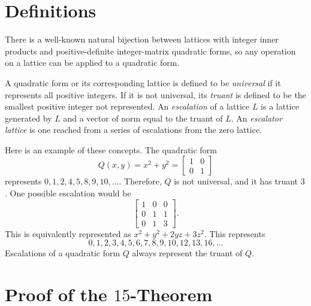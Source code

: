 \documentclass[letterpaper, 12pt]{article}
\begin{document}
\section{Definitions}
There is a well-known natural bijection between lattices with integer inner products and positive-definite integer-matrix quadratic forms, so any operation on a lattice can be applied to a quadratic form.

A quadratic form or its corresponding lattice is defined to be \emph{universal} if it represents all positive integers. If it is not universal, its \emph{truant} is defined to be the smallest positive integer not represented. An \emph{escalation} of a lattice $L$ is a lattice generated by $L$ and a vector of norm equal to the truant of $L$. An \emph{escalator lattice} is one reached from a series of escalations from the zero lattice.

Here is an example of these concepts. The quadratic form
\[Q(x, y) = x^2 + y^2 = \begin{bmatrix} 1 & 0 \\ 0 & 1 \end{bmatrix}\]
represents $0, 1, 2, 4, 5, 8, 9, 10, \ldots$. Therefore, $Q$ is not universal, and it has truant $3$. One possible escalation would be
\[\begin{bmatrix} 1 & 0 & 0 \\ 0 & 1 & 1 \\ 0 & 1 & 3 \end{bmatrix}.\]
This is equivalently represented as $x^2 + y^2 + 2yz + 3z^2$. This represents
\[0, 1, 2, 3, 4, 5, 6, 7, 8, 9, 10, 12, 13, 16, \ldots\]
Escalations of a quadratic form $Q$ always represent the truant of $Q$.

\section{Proof of the $15$-Theorem}
\end{document}

